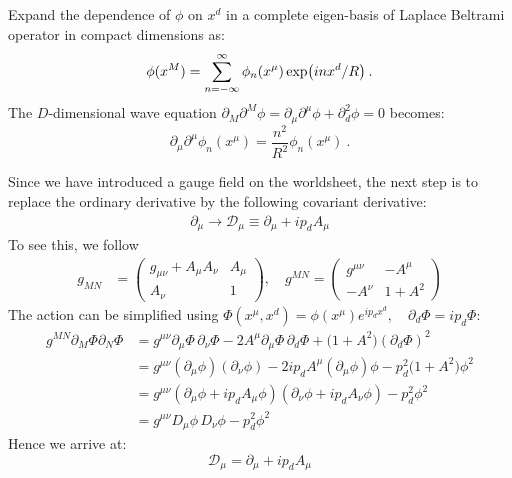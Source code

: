 Expand the dependence of $\phi$ on $x^{d}$ in a complete eigen-basis of Laplace Beltrami operator in compact dimensions as:
\begin{equation}
	\phi(x^{M})=\sum_{n=-\infty}^{\infty} \phi_{n}(x^{\mu}) \exp (i n x^{d} / R) \:. \label{8.1.5}
\end{equation}
The $D$-dimensional wave equation $\partial_{M} \partial^{M} \phi=\partial_{\mu}\partial^{\mu}\phi+\partial_d^2\phi=0$ becomes:
\begin{equation}
	\partial_{\mu} \partial^{\mu} \phi_{n}(x^{\mu})=\frac{n^{2}}{R^{2}} \phi_{n}(x^{\mu}) \:. \label{8.1.6}
\end{equation}
\begin{tcolorbox}[breakable]
	\begin{remark}
		Since we have introduced a gauge field on the worldsheet, the next step is to replace the ordinary derivative by the following covariant derivative:
		\begin{align*}
			\partial_{\mu} \to\mathcal{D}_{\mu}\equiv\partial_{\mu}+ip_dA_{\mu}
		\end{align*}
		To see this, we follow
		\begin{align*}
			g_{MN} &=
			\begin{pmatrix}
				g_{\mu\nu} +  A_\mu A_\nu &  A_\mu \\
				A_\nu & 1
			\end{pmatrix},
			\quad
			g^{MN} =
			\begin{pmatrix}
				g^{\mu\nu} & -A^\mu \\
				- A^\nu & 1 + A^2
			\end{pmatrix}
		\end{align*}
		The action can be simplified using $\Phi(x^\mu,x^d) = \phi(x^\mu)e^{i p_d x^d}, \quad \partial_d\Phi = i p_d \Phi$:
		\begin{align*}
			g^{MN}\partial_M \Phi \partial_N \Phi
			&= g^{\mu\nu}\partial_\mu\Phi\,\partial_\nu\Phi
			-2 A^\mu \partial_\mu\Phi\,\partial_d\Phi
			+\big(1+A^2\big)(\partial_d\Phi)^2
			\\[6pt]
			&= g^{\mu\nu}(\partial_\mu\phi)(\partial_\nu\phi)
			-2 i p_d A^\mu (\partial_\mu\phi)\phi
			- p^2_d\big(1+A^2\big)\phi^2
			\\[6pt]
			&= g^{\mu\nu}
			(\partial_\mu\phi + i p_d A_\mu \phi)
			(\partial_\nu\phi + i p_d A_\nu \phi)
			- p^2_d \phi^2
			\\[6pt]
			&= g^{\mu\nu} D_\mu \phi\, D_\nu \phi
			- p^2_d\phi^2
		\end{align*}
		Hence we arrive at:
		\[
		\mathcal{D}_\mu = \partial_\mu + i p_d A_\mu
		\]
	\end{remark}
\end{tcolorbox}

